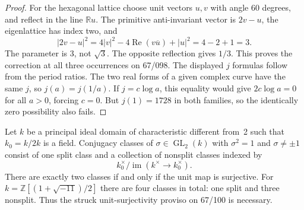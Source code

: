 \begin{proof}
For the hexagonal lattice choose unit vectors $u,v$ with angle
$60$ degrees, and reflect in the line $\mathbb Ru$. The primitive
anti-invariant vector is $2v-u$, the eigenlattice has index two,
and
\[
 |2v-u|^2=4|v|^2-4\operatorname{Re}(v\overline u)+|u|^2
         =4-2+1=3.
\]
The parameter is $3$, not $\sqrt3$. The opposite reflection gives
$1/3$. This proves the correction at all three occurrences on
67/098. The displayed $j$ formulas follow from the period ratios.
The two real forms of a given complex curve have the same $j$, so
$j(a)=j(1/a)$. If $j=c\log a$, this equality would give
$2c\log a=0$ for all $a>0$, forcing $c=0$. But $j(1)=1728$ in
both families, so the identically zero possibility also fails.
\end{proof}

\begin{proposition}
\label{A:pid-involutions}
Let $k$ be a principal ideal domain of characteristic different
from~2 such that $k_0=k/2k$ is a field. Conjugacy classes of
$\sigma\in\operatorname{GL}_2(k)$ with $\sigma^2=1$ and
$\sigma\ne\pm1$ consist of one split class and a collection of
nonsplit classes indexed by
\[
 k_0^\times/\operatorname{im}(k^\times\longrightarrow k_0^\times).
\]
There are exactly two classes if and only if the unit map is
surjective. For $k=\mathbb Z[(1+\sqrt{-11})/2]$ there are four
classes in total: one split and three nonsplit. Thus the struck
unit-surjectivity proviso on 67/100 is necessary.
\end{proposition}

